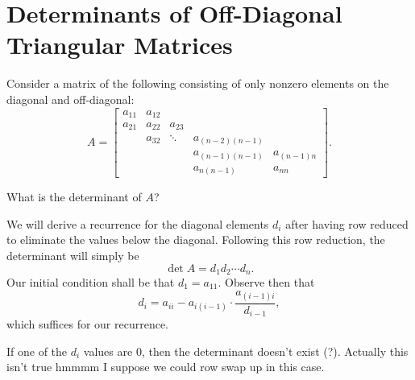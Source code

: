 \documentclass[a4paper, 12pt]{article}
\begin{document}
\section*{Determinants of Off-Diagonal Triangular Matrices}

Consider a matrix of the following consisting of only nonzero elements on the diagonal and off-diagonal:
\[
    A = \begin{bmatrix}
        a_{11} & a_{12} \\
        a_{21} & a_{22} & a_{23} \\
        & a_{32} & \ddots & a_{(n-2)(n-1)} \\
        & & & a_{(n-1)(n-1)} & a_{(n-1)n} \\
        & & & a_{n(n-1)} & a_{nn}
    \end{bmatrix}
.\]

\begin{blackbox}
    \begin{problem}
        What is the determinant of \( A \)?
    \end{problem}
\end{blackbox}

\begin{solution}
    We will derive a recurrence for the diagonal elements \( d_i \) after having row reduced to eliminate the values below the diagonal. Following this row reduction, the determinant will simply be
    \[
        \det A = d_1 d_2 \cdots d_n
    .\]
    Our initial condition shall be that \( d_1 = a_11 \). Observe then that
    \[
        d_i = a_{ii} - a_{i(i-1)} \cdot \frac{a_{(i-1)i}}{d_{i-1}}
    ,\]
    which suffices for our recurrence.

    If one of the \( d_i \) values are \( 0 \), then the determinant doesn't exist (?). Actually this isn't true hmmmm I suppose we could row swap up in this case.
\end{solution}
\end{document}
